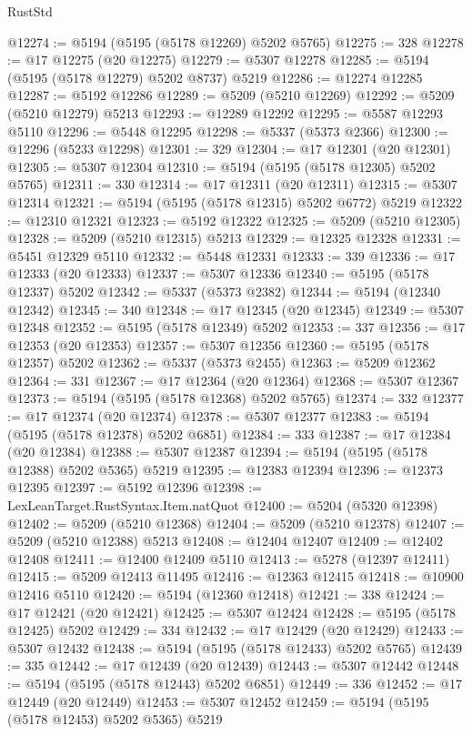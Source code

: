 \begin{lexlean}{RustStd}
\begin{coremodule}
@12274 := @5194 (@5195 (@5178 @12269) @5202 @5765)
@12275 := 328
@12278 := @17 @12275 (@20 @12275)
@12279 := @5307 @12278
@12285 := @5194 (@5195 (@5178 @12279) @5202 @8737) @5219
@12286 := @12274 @12285
@12287 := @5192 @12286
@12289 := @5209 (@5210 @12269)
@12292 := @5209 (@5210 @12279) @5213
@12293 := @12289 @12292
@12295 := @5587 @12293 @5110
@12296 := @5448 @12295
@12298 := @5337 (@5373 @2366)
@12300 := @12296 (@5233 @12298)
@12301 := 329
@12304 := @17 @12301 (@20 @12301)
@12305 := @5307 @12304
@12310 := @5194 (@5195 (@5178 @12305) @5202 @5765)
@12311 := 330
@12314 := @17 @12311 (@20 @12311)
@12315 := @5307 @12314
@12321 := @5194 (@5195 (@5178 @12315) @5202 @6772) @5219
@12322 := @12310 @12321
@12323 := @5192 @12322
@12325 := @5209 (@5210 @12305)
@12328 := @5209 (@5210 @12315) @5213
@12329 := @12325 @12328
@12331 := @5451 @12329 @5110
@12332 := @5448 @12331
@12333 := 339
@12336 := @17 @12333 (@20 @12333)
@12337 := @5307 @12336
@12340 := @5195 (@5178 @12337) @5202
@12342 := @5337 (@5373 @2382)
@12344 := @5194 (@12340 @12342)
@12345 := 340
@12348 := @17 @12345 (@20 @12345)
@12349 := @5307 @12348
@12352 := @5195 (@5178 @12349) @5202
@12353 := 337
@12356 := @17 @12353 (@20 @12353)
@12357 := @5307 @12356
@12360 := @5195 (@5178 @12357) @5202
@12362 := @5337 (@5373 @2455)
@12363 := @5209 @12362
@12364 := 331
@12367 := @17 @12364 (@20 @12364)
@12368 := @5307 @12367
@12373 := @5194 (@5195 (@5178 @12368) @5202 @5765)
@12374 := 332
@12377 := @17 @12374 (@20 @12374)
@12378 := @5307 @12377
@12383 := @5194 (@5195 (@5178 @12378) @5202 @6851)
@12384 := 333
@12387 := @17 @12384 (@20 @12384)
@12388 := @5307 @12387
@12394 := @5194 (@5195 (@5178 @12388) @5202 @5365) @5219
@12395 := @12383 @12394
@12396 := @12373 @12395
@12397 := @5192 @12396
@12398 := LexLeanTarget.RustSyntax.Item.natQuot
@12400 := @5204 (@5320 @12398)
@12402 := @5209 (@5210 @12368)
@12404 := @5209 (@5210 @12378)
@12407 := @5209 (@5210 @12388) @5213
@12408 := @12404 @12407
@12409 := @12402 @12408
@12411 := @12400 @12409 @5110
@12413 := @5278 (@12397 @12411)
@12415 := @5209 @12413 @11495
@12416 := @12363 @12415
@12418 := @10900 @12416 @5110
@12420 := @5194 (@12360 @12418)
@12421 := 338
@12424 := @17 @12421 (@20 @12421)
@12425 := @5307 @12424
@12428 := @5195 (@5178 @12425) @5202
@12429 := 334
@12432 := @17 @12429 (@20 @12429)
@12433 := @5307 @12432
@12438 := @5194 (@5195 (@5178 @12433) @5202 @5765)
@12439 := 335
@12442 := @17 @12439 (@20 @12439)
@12443 := @5307 @12442
@12448 := @5194 (@5195 (@5178 @12443) @5202 @6851)
@12449 := 336
@12452 := @17 @12449 (@20 @12449)
@12453 := @5307 @12452
@12459 := @5194 (@5195 (@5178 @12453) @5202 @5365) @5219

\end{coremodule}
\end{lexlean}
